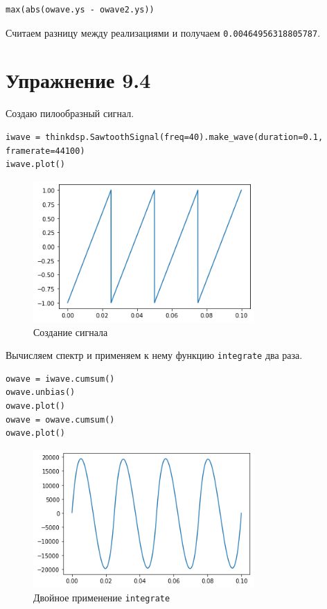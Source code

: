 \documentclass[a4paper,12pt]{report}
\begin{document}
\begin{lstlisting}[caption=Разница между реализациями]
max(abs(owave.ys - owave2.ys))
\end{lstlisting}

Считаем разницу между реализациями и получаем \texttt{0.00464956318805787}.

\chapter{Упражнение 9.4}

Создаю пилообразный сигнал.

\begin{lstlisting}[caption=Создание сигнала]
iwave = thinkdsp.SawtoothSignal(freq=40).make_wave(duration=0.1, framerate=44100)
iwave.plot()
\end{lstlisting}

\begin{figure}[H]
        \centering
        \includegraphics[width=0.75\textwidth]{8.png}
        \caption{Создание сигнала}
        \label{8}
\end{figure}

Вычисляем спектр и применяем к нему функцию \texttt{integrate} два раза.

\begin{lstlisting}[caption=двойное применение \texttt{integrate}]
owave = iwave.cumsum()
owave.unbias()
owave.plot()
owave = owave.cumsum()
owave.plot()
\end{lstlisting}

\begin{figure}[H]
        \centering
        \includegraphics[width=0.75\textwidth]{9.png}
        \caption{Двойное применение \texttt{integrate}}
        \label{9}
\end{figure}
\end{document}
